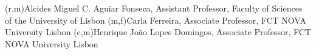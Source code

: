 (r,m){Alcides Miguel C. Aguiar Fonseca, Assistant Professor, Faculty of Sciences of the University of Lisbon}
(m,f){Carla Ferreira, Associate Professor, FCT NOVA University Lisbon}
(c,m){Henrique João Lopes Domingos, Associate Professor, FCT NOVA University Lisbon}
